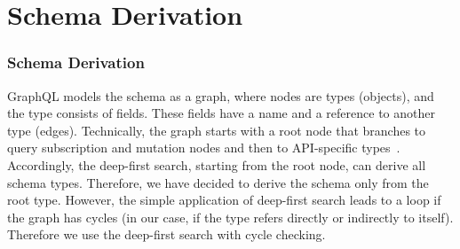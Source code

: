 
\section{Schema Derivation} 
\begin{frame}\frametitle{Schema Derivation}

GraphQL models the schema as a graph, where nodes are types (objects), and the type consists of fields. These fields have a name and a reference to another type (edges). Technically, the graph starts with a root node that branches to query subscription and mutation nodes and then to API-specific types~\cite{migrating-to-gql}. Accordingly, the deep-first search, starting from the root node, can derive all schema types. Therefore, we have decided to derive the schema only from the root type. However, the simple application of deep-first search leads to a loop if the graph has cycles (in our case, if the type refers directly or indirectly to itself). Therefore we use the deep-first search with cycle checking.


\end{frame}
